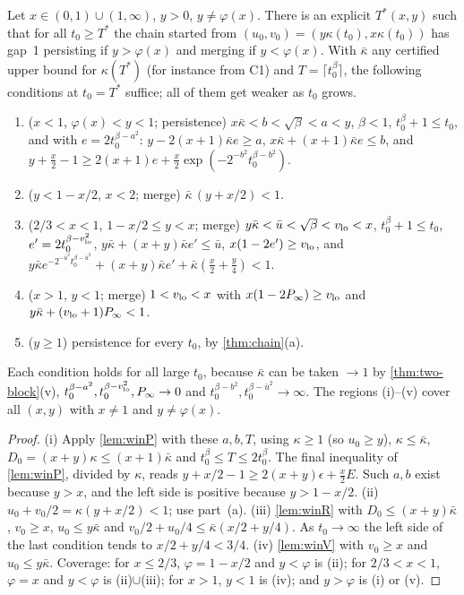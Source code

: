 \begin{theorem}\label{thm:B2}
Let $x\in(0,1)\cup(1,\infty)$, $y>0$, $y\ne\varphi(x)$. There is an explicit $T^*(x,y)$ such that for all $t_0\ge T^*$ the chain started from
$(u_0,v_0)=(y\kappa(t_0),x\kappa(t_0))$ has gap~1 persisting if $y>\varphi(x)$ and merging if $y<\varphi(x)$. With $\bar\kappa$ any certified
upper bound for $\kappa(T^*)$ (for instance from C1) and $T=\lceil t_0^\beta\rceil$, the following conditions at $t_0=T^*$ suffice; all
of them get weaker as $t_0$ grows.
\begin{enumerate}[label=(\roman*),leftmargin=2em,itemsep=1pt]
\item ($x<1$, $\varphi(x)<y<1$; persistence) $x\bar\kappa<b<\sqrt\beta<a<y$, $\beta<1$, $t_0^\beta+1\le t_0$, and with $e=2t_0^{\beta-a^2}$:
$y-2(x+1)\bar\kappa e\ge a$, $x\bar\kappa+(x+1)\bar\kappa e\le b$, and $y+\frac x2-1\ge2(x+1)e+\frac x2\exp(-2^{-b^2}t_0^{\beta-b^2})$.
\item ($y<1-x/2$, $x<2$; merge) $\bar\kappa\,(y+x/2)<1$.
\item ($2/3<x<1$, $1-x/2\le y<x$; merge) $y\bar\kappa<\bar u<\sqrt\beta<v_{\rm lo}<x$, $t_0^\beta+1\le t_0$, $e'=2t_0^{\beta-v_{\rm lo}^2}$,
$y\bar\kappa+(x+y)\bar\kappa e'\le\bar u$, $x(1-2e')\ge v_{\rm lo}$, and
$y\bar\kappa e^{-2^{-\bar u^2}t_0^{\beta-\bar u^2}}+(x+y)\bar\kappa e'+\bar\kappa(\frac x2+\frac y4)<1$.
\item ($x>1$, $y<1$; merge) $1<v_{\rm lo}<x$ with $x(1-2P_\infty)\ge v_{\rm lo}$ and $y\bar\kappa+(v_{\rm lo}+1)P_\infty<1$.
\item ($y\ge1$) persistence for every $t_0$, by \cref{thm:chain}(a).
\end{enumerate}
Each condition holds for all large $t_0$, because $\bar\kappa$ can be taken $\to1$ by \cref{thm:two-block}(v), $t_0^{\beta-a^2},t_0^{\beta-v_{\rm lo}^2},
P_\infty\to0$ and $t_0^{\beta-b^2},t_0^{\beta-\bar u^2}\to\infty$. The regions (i)--(v) cover all $(x,y)$ with $x\ne1$ and $y\ne\varphi(x)$.
\end{theorem}
\begin{proof}
(i) Apply \cref{lem:winP} with these $a,b,T$, using $\kappa\ge1$ (so $u_0\ge y$), $\kappa\le\bar\kappa$, $D_0=(x+y)\kappa\le(x+1)\bar\kappa$ and
$t_0^\beta\le T\le2t_0^\beta$. The final inequality of \cref{lem:winP}, divided by $\kappa$, reads $y+x/2-1\ge2(x+y)\epsilon+\frac x2E$. Such $a,b$
exist because $y>x$, and the left side is positive because $y>1-x/2$.
(ii) $u_0+v_0/2=\kappa(y+x/2)<1$; use part~(a).
(iii) \cref{lem:winR} with $D_0\le(x+y)\bar\kappa$, $v_0\ge x$, $u_0\le y\bar\kappa$ and $v_0/2+u_0/4\le\bar\kappa(x/2+y/4)$. As $t_0\to\infty$ the left
side of the last condition tends to $x/2+y/4<3/4$.
(iv) \cref{lem:winV} with $v_0\ge x$ and $u_0\le y\bar\kappa$.
Coverage: for $x\le2/3$, $\varphi=1-x/2$ and $y<\varphi$ is (ii); for $2/3<x<1$, $\varphi=x$ and $y<\varphi$ is (ii)$\cup$(iii); for $x>1$, $y<1$ is
(iv); and $y>\varphi$ is (i) or (v).
\end{proof}

